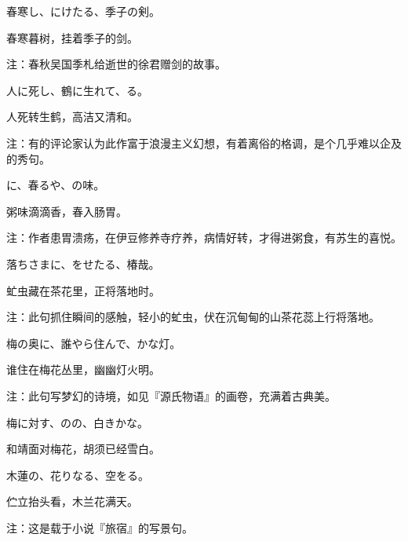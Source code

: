 \begin{haiku}
    {\FH 春寒し、にけたる、季子の剣。}

    {\FK 春寒暮树，挂着季子的剑。}

    {\FT 注：春秋吴国季札给逝世的徐君赠剑的故事。}
\end{haiku}

\begin{haiku}
    {\FH 人に死し、鶴に生れて、る。}

    {\FK 人死转生鹤，高洁又清和。}

    {\FT 注：有的评论家认为此作富于浪漫主义幻想，有着离俗的格调，是个几乎难以企及的秀句。}
\end{haiku}

\begin{haiku}
    {\FH {}に、春るや、の味。}

    {\FK 粥味滴滴香，春入肠胃。}

    {\FT 注：作者患胃溃疡，在伊豆修养寺疗养，病情好转，才得进粥食，有苏生的喜悦。}
\end{haiku}

\begin{haiku}
    {\FH 落ちさまに、をせたる、椿哉。}

    {\FK 虻虫藏在茶花里，正将落地时。}

    {\FT 注：此句抓住瞬间的感触，轻小的虻虫，伏在沉甸甸的山茶花蕊上行将落地。}
\end{haiku}

\begin{haiku}
    {\FH 梅の奥に、誰やら住んで、かな灯。}

    {\FK 谁住在梅花丛里，幽幽灯火明。}

    {\FT 注：此句写梦幻的诗境，如见『源氏物语』的画卷，充满着古典美。}
\end{haiku}

\begin{haiku}
    {\FH 梅に対す、のの、白きかな。}

    {\FK 和靖面对梅花，胡须已经雪白。}
\end{haiku}

\begin{haiku}
    {\FH 木蓮の、花りなる、空をる。}

    {\FK 伫立抬头看，木兰花满天。}

    {\FT 注：这是载于小说『旅宿』的写景句。}
\end{haiku}

